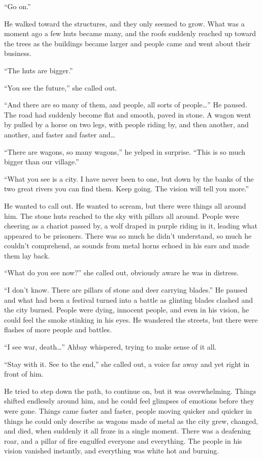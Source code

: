 ``Go on.''

He walked toward the structures, and they only seemed to grow. What was a moment ago a few huts became many, and the roofs suddenly reached up toward the trees as the buildings became larger and people came and went about their business.

``The huts are bigger.''

``You see the future,'' she called out.

``And there are so many of them, and people, all sorts of people\ldots'' He paused. The road had suddenly become flat and smooth, paved in stone. A wagon went by pulled by a horse on two legs, with people riding by, and then another, and another, and faster and faster and\ldots

``There are wagons, so many wagons,'' he yelped in surprise. ``This is so much bigger than our village.''

``What you see is a city. I have never been to one, but down by the banks of the two great rivers you can find them. Keep going. The vision will tell you more.''

He wanted to call out. He wanted to scream, but there were things all around him. The stone huts reached to the sky with pillars all around. People were cheering as a chariot passed by, a wolf draped in purple riding in it, leading what appeared to be prisoners. There was so much he didn't understand, so much he couldn't comprehend, as sounds from metal horns echoed in his ears and made them lay back.

``What do you see now?'' she called out, obviously aware he was in distress.

``I don't know. There are pillars of stone and deer carrying blades.'' He paused and what had been a festival turned into a battle as glinting blades clashed and the city burned. People were dying, innocent people, and even in his vision, he could feel the smoke stinking in his eyes. He wandered the streets, but there were flashes of more people and battles.

``I see war, death\ldots'' Ahbay whispered, trying to make sense of it all.

``Stay with it. See to the end,'' she called out, a voice far away and yet right in front of him.

He tried to step down the path, to continue on, but it was overwhelming. Things shifted endlessly around him, and he could feel glimpses of emotions before they were gone. Things came faster and faster, people moving quicker and quicker in things he could only describe as wagons made of metal as the city grew, changed, and died, when suddenly it all froze in a single moment. There was a deafening roar, and a pillar of fire engulfed everyone and everything. The people in his vision vanished instantly, and everything was white hot and burning.

